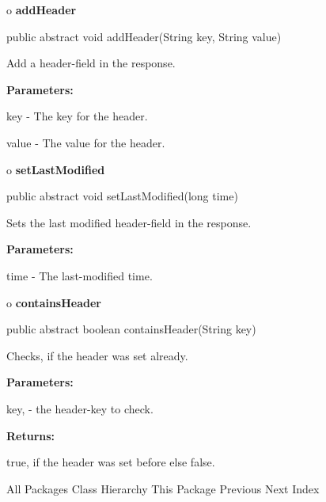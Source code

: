 o {\bf addHeader} 

\begin{PRE}
 public abstract void addHeader(String key,
                                String value)
\end{PRE}

\begin{description}
\htmlDD Add a header-field in the response. 

\begin{description}
\item {\bf Parameters:}  

key - The key for the header.  

value - The value for the header.  
\end{description}

\end{description}

o {\bf setLastModified} 

\begin{PRE}
 public abstract void setLastModified(long time)
\end{PRE}

\begin{description}
\htmlDD Sets the last modified header-field in the response. 

\begin{description}
\item {\bf Parameters:}  

time - The last-modified time.  
\end{description}

\end{description}

o {\bf containsHeader} 

\begin{PRE}
 public abstract boolean containsHeader(String key)
\end{PRE}

\begin{description}
\htmlDD Checks, if the header was set already. 

\begin{description}
\item {\bf Parameters:}  

key, - the header-key to check.  
\item {\bf Returns:}  

true, if the header was set before else false.  
\end{description}

\end{description}

\htmlHR

\begin{PRE}
All Packages  Class Hierarchy  This Package  Previous  Next  Index
\end{PRE}

